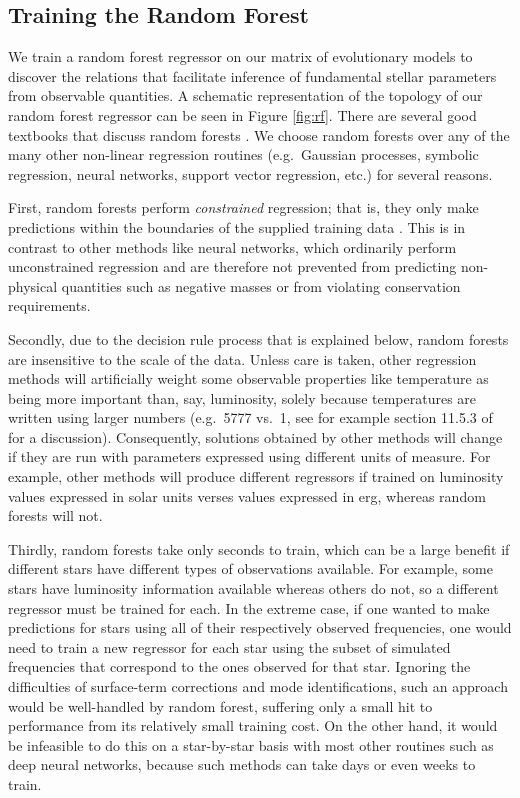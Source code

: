 \documentclass[manuscript,linenumbers]{aastex6}
\begin{document}
\subsection{Training the Random Forest} \label{sec:forest}
We train a random forest regressor on our matrix of evolutionary models to discover the relations that facilitate inference of fundamental stellar parameters from observable quantities. A schematic representation of the topology of our random forest regressor can be seen in Figure \ref{fig:rf}. There are several good textbooks that discuss random forests \citep[see e.g.][Chapter 15]{hastie2005elements}. We choose random forests over any of the many other non-linear regression routines (e.g.\ Gaussian processes, symbolic regression, neural networks, support vector regression, etc.) for several reasons. 

First, random forests perform \emph{constrained} regression; that is, they only make predictions within the boundaries of the supplied training data \citep[see e.g.][Section 9.2.1]{hastie2005elements}. This is in contrast to other methods like neural networks, which ordinarily perform unconstrained regression and are therefore not prevented from predicting non-physical quantities such as negative masses or from violating conservation requirements. 

Secondly, due to the decision rule process that is explained below, random forests are insensitive to the scale of the data. Unless care is taken, other regression methods will artificially weight some observable properties like temperature as being more important than, say, luminosity, solely because temperatures are written using larger numbers (e.g.\ 5777 vs.\ 1, see for example section 11.5.3 of \citealt{hastie2005elements} for a discussion). Consequently, solutions obtained by other methods will change if they are run with parameters expressed using different units of measure. For example, other methods will produce different regressors if trained on luminosity values expressed in solar units verses values expressed in erg, whereas random forests will not. 

Thirdly, random forests take only seconds to train, which can be a large benefit if different stars have different types of observations available. For example, some stars have luminosity information available whereas others do not, so a different regressor must be trained for each. In the extreme case, if one wanted to make predictions for stars using all of their respectively observed frequencies, one would need to train a new regressor for each star using the subset of simulated frequencies that correspond to the ones observed for that star. Ignoring the difficulties of surface-term corrections and mode identifications, such an approach would be well-handled by random forest, suffering only a small hit to performance from its relatively small training cost. On the other hand, it would be infeasible to do this on a star-by-star basis with most other routines such as deep neural networks, because such methods can take days or even weeks to train. 
\end{document}
